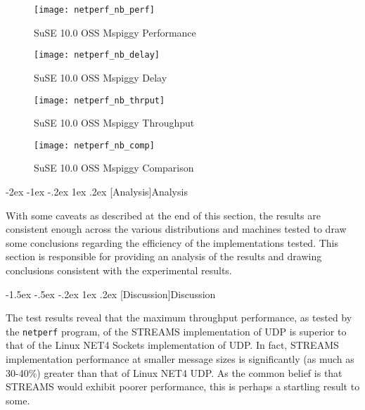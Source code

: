 \documentclass[letterpaper,final,notitlepage,twocolumn,10pt,twoside]{article}
\makeatletter
\renewcommand\section{\@startsection {section}{1}{\z@}%
                                   {-2ex \@plus -1ex \@minus -.2ex}%
                                   {1ex \@plus .2ex}%
                                   {\normalfont\large\bfseries}}
\renewcommand\subsection{\@startsection{subsection}{2}{\z@}%
                                     {-1.5ex \@plus -.5ex \@minus -.2ex}%
                                     {1ex \@plus .2ex}%
                                     {\normalfont\normalsize\bfseries}}
\makeatother
\begin{document}
\begin{figure}[p]
\center\texttt{[image: netperf\_nb\_perf]}
\caption[SuSE 10.0 OSS Mspiggy Performance]{SuSE 10.0 OSS Mspiggy Performance}
\label{figure:nbperf}
\end{figure}

\begin{figure}[p]
\center\texttt{[image: netperf\_nb\_delay]}
\caption[SuSE 10.0 OSS Mspiggy Delay]{SuSE 10.0 OSS Mspiggy Delay}
\label{figure:nbdly}
\end{figure}

\begin{figure}[p]
\center\texttt{[image: netperf\_nb\_thrput]}
\caption[SuSE 10.0 OSS Mspiggy Throughput]{SuSE 10.0 OSS Mspiggy Throughput}
\label{figure:nbthrput}
\end{figure}

\begin{figure}[pt]
\center\texttt{[image: netperf\_nb\_comp]}
\caption[SuSE 10.0 OSS Mspiggy Comparison]{SuSE 10.0 OSS Mspiggy Comparison}
\label{figure:nbcomp}
\end{figure}

\section[Analysis]{Analysis}

With some caveats as described at the end of this section, the results are consistent enough across
the various distributions and machines tested to draw some conclusions regarding the efficiency of
the implementations tested.  This section is responsible for providing an analysis of the results
and drawing conclusions consistent with the experimental results.

\subsection[Discussion]{Discussion}

The test results reveal that the maximum throughput performance, as tested by the \texttt{netperf}
program, of the STREAMS implementation of UDP is superior to that of the Linux NET4 Sockets
implementation of UDP.  In fact, STREAMS implementation performance at smaller message sizes is
significantly (as much as 30-40\%) greater than that of Linux NET4 UDP.  As the common belief is
that STREAMS would exhibit poorer performance, this is perhaps a startling result to some.
\end{document}
